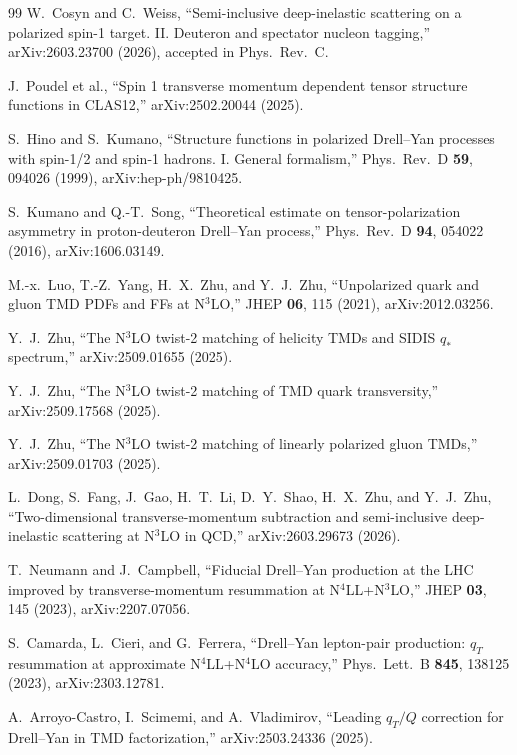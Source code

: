 \documentclass[11pt]{article}
\begin{document}
\begin{thebibliography}{99}
W.~Cosyn and C.~Weiss,
``Semi-inclusive deep-inelastic scattering on a polarized spin-1 target. II. Deuteron and spectator nucleon tagging,''
arXiv:2603.23700 (2026), accepted in Phys.\ Rev.\ C.

J.~Poudel et al.,
``Spin 1 transverse momentum dependent tensor structure functions in CLAS12,''
arXiv:2502.20044 (2025).

S.~Hino and S.~Kumano,
``Structure functions in polarized Drell--Yan processes with spin-1/2 and spin-1 hadrons. I. General formalism,''
Phys.\ Rev.\ D \textbf{59}, 094026 (1999), arXiv:hep-ph/9810425.

S.~Kumano and Q.-T.~Song,
``Theoretical estimate on tensor-polarization asymmetry in proton-deuteron Drell--Yan process,''
Phys.\ Rev.\ D \textbf{94}, 054022 (2016), arXiv:1606.03149.

M.-x.~Luo, T.-Z.~Yang, H.~X.~Zhu, and Y.~J.~Zhu,
``Unpolarized quark and gluon TMD PDFs and FFs at N\(^3\)LO,''
JHEP \textbf{06}, 115 (2021), arXiv:2012.03256.

Y.~J.~Zhu,
``The N\(^3\)LO twist-2 matching of helicity TMDs and SIDIS \(q_\ast\) spectrum,''
arXiv:2509.01655 (2025).

Y.~J.~Zhu,
``The N\(^3\)LO twist-2 matching of TMD quark transversity,''
arXiv:2509.17568 (2025).

Y.~J.~Zhu,
``The N\(^3\)LO twist-2 matching of linearly polarized gluon TMDs,''
arXiv:2509.01703 (2025).

L.~Dong, S.~Fang, J.~Gao, H.~T.~Li, D.~Y.~Shao, H.~X.~Zhu, and Y.~J.~Zhu,
``Two-dimensional transverse-momentum subtraction and semi-inclusive deep-inelastic scattering at N\(^3\)LO in QCD,''
arXiv:2603.29673 (2026).

T.~Neumann and J.~Campbell,
``Fiducial Drell--Yan production at the LHC improved by transverse-momentum resummation at N\(^4\)LL+N\(^3\)LO,''
JHEP \textbf{03}, 145 (2023), arXiv:2207.07056.

S.~Camarda, L.~Cieri, and G.~Ferrera,
``Drell--Yan lepton-pair production: \(q_T\) resummation at approximate N\(^4\)LL+N\(^4\)LO accuracy,''
Phys.\ Lett.\ B \textbf{845}, 138125 (2023), arXiv:2303.12781.

A.~Arroyo-Castro, I.~Scimemi, and A.~Vladimirov,
``Leading \(q_T/Q\) correction for Drell--Yan in TMD factorization,''
arXiv:2503.24336 (2025).


\end{thebibliography}
\end{document}
